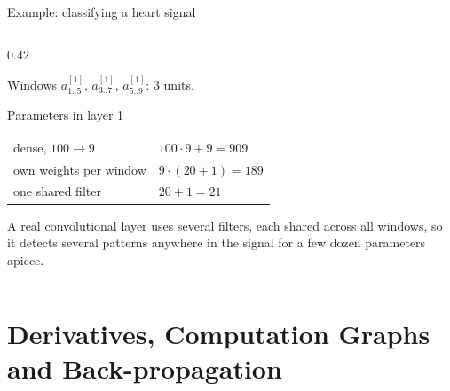 \documentclass[aspectratio=169,10pt]{beamer}
\begin{document}
\begin{frame}{Example: classifying a heart signal}
\begin{columns}[T,onlytextwidth]
\begin{column}{0.42\textwidth}
\begin{block}{Windows}
        $a^{[1]}_{1..5}$, $a^{[1]}_{3..7}$, $a^{[1]}_{5..9}$: $3$ units.
      \end{block}
      \begin{block}{Parameters in layer 1}
        \renewcommand{\arraystretch}{1.15}
        \begin{tabular}{@{}ll@{}}
          dense, $100\to9$ & $100\cdot9+9=909$\\
          own weights per window & $9\cdot(20+1)=189$\\
          one shared filter & $20+1=21$\\
        \end{tabular}
      \end{block}
      \begin{keyidea}
        A real convolutional layer uses several filters, each shared across all windows,
        so it detects several patterns anywhere in the signal for a few dozen parameters
        apiece.
      \end{keyidea}
    \end{column}
  \end{columns}
\end{frame}

\section{Derivatives, Computation Graphs and Back-propagation}
\end{document}

